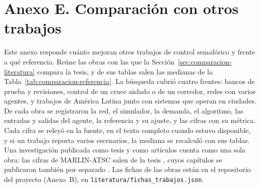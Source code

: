 \section*{Anexo E. Comparación con otros trabajos}
{}
\makeatletter{}\makeatother
\label{anx:trabajos}
\setcounter{table}{0}
\renewcommand{\thetable}{E.\arabic{table}}
\renewcommand{\theHtable}{E.\arabic{table}}

Este anexo responde cuánto mejoran otros trabajos de control semafórico
y frente a qué referencia. Reúne las obras con las que la
Sección~\ref{sec:comparacion-literatura} compara la tesis, y de sus
tablas salen las medianas de la Tabla~\ref{tab:comparacion-referencia}.
La búsqueda cubrió cuatro frentes: bancos de prueba y revisiones,
control de un cruce aislado o de un corredor, redes con varios agentes,
y trabajos de América Latina junto con sistemas que operan en ciudades.
De cada obra se registraron la red, el simulador, la demanda, el
algoritmo, las entradas y salidas del agente, la referencia y su ajuste,
y las cifras con su métrica. Cada cifra se releyó en la fuente, en el texto completo cuando
estuvo disponible, y si un trabajo reporta varios escenarios, la mediana
se recalculó con sus tablas. Una investigación publicada como tesis y
como artículos cuenta como una sola obra: las cifras de MARLIN-ATSC
salen de la tesis \citep{ElTantawy2012_Tesis}, cuyos capítulos se
publicaron también por separado
\citep{ElTantawy2012_ITSC,ElTantawy2014_Parametros,ElTantawy2013_MARLIN}.
Las fichas de las obras están en el repositorio del proyecto (Anexo~B),
en \texttt{literatura/\allowbreak fichas\_trabajos.json}.

